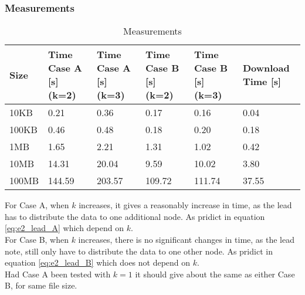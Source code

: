 \subsubsection*{Measurements}
\begin{table}[H]
    \begin{tabularx}{\textwidth}{|X|X|X|X|X|X|}
        \hline
        \cellcolor{lightgray}\textbf{Size} & \cellcolor{lightgray}\textbf{Time Case A [s] (k=2)} & \cellcolor{lightgray}\textbf{Time Case A [s] (k=3)} & \cellcolor{lightgray}\textbf{Time Case B [s] (k=2)} & \cellcolor{lightgray}\textbf{Time Case B [s] (k=3)} & \cellcolor{lightgray}\textbf{Download Time [s]}\\\hline
        10KB  & 0.21    & 0.36   & 0.17   & 0.16   & 0.04  \\\hline
        100KB & 0.46    & 0.48   & 0.18   & 0.20   & 0.18  \\\hline
        1MB   & 1.65    & 2.21   & 1.31   & 1.02   & 0.42  \\\hline
        10MB  & 14.31   & 20.04  & 9.59   & 10.02  & 3.80  \\\hline
        100MB & 144.59  & 203.57 & 109.72 & 111.74 & 37.55 \\\hline
    \end{tabularx}
    \caption{Measurements}
	\label{tab:e2meas}
\end{table}

For Case A, when $k$ increases, it gives a reasonably increase in time, as the lead has to distribute the data to one additional node. As pridict in equation \ref{eq:e2_lead_A} which depend on $k$.\\
For Case B, when $k$ increases, there is no significant changes in time, as the lead note, still only have to distribute the data to one other node. As pridict in equation \ref{eq:e2_lead_B} which does not depend on $k$.\\
Had Case A been tested with $k=1$ it should give about the same as either Case B, for same file size.